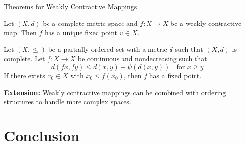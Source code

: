 \documentclass[aspectratio=169,10pt]{beamer}
\begin{document}
\begin{frame}{Theorems for Weakly Contractive Mappings}
  \begin{theorem}
    Let $(X, d)$ be a complete metric space and $f : X \to X$ be a weakly contractive map.
    Then $f$ has a unique fixed point $u \in X$.
  \end{theorem}

  \vspace{0.3cm}

  \begin{theorem}
    Let $(X, \leq)$ be a partially ordered set with a metric $d$ such that $(X,d)$ is complete.
    Let $f : X \to X$ be continuous and nondecreasing such that
    \[
      d(fx, fy) \leq d(x,y) - \psi(d(x,y)) \quad \text{for } x \geq y
    \]
    If there exists $x_0 \in X$ with $x_0 \leq f(x_0)$, then $f$ has a fixed point.
  \end{theorem}

  \vspace{0.3cm}

  \textbf{Extension:} Weakly contractive mappings can be combined with ordering structures
  to handle more complex spaces.
\end{frame}

\section{Conclusion}
\end{document}
